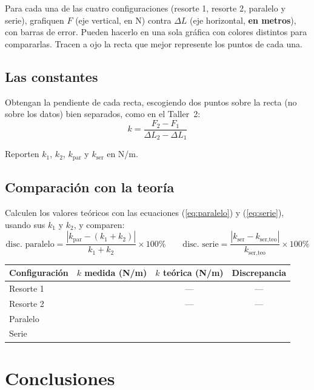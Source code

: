 \documentclass[11pt, letterpaper]{article}
\begin{document}
	Para cada una de las cuatro configuraciones (resorte 1, resorte 2, paralelo y
	serie), grafiquen $F$ (eje vertical, en N) contra $\Delta L$ (eje
	horizontal, \textbf{en metros}), con barras de error. Pueden hacerlo en una
	sola gráfica con colores distintos para compararlas. Tracen a ojo la recta
	que mejor represente los puntos de cada una.
	
	\subsection{Las constantes}
	
	Obtengan la pendiente de cada recta, escogiendo dos puntos sobre la recta
	(no sobre los datos) bien separados, como en el Taller~2:
	\[
	k = \frac{F_2 - F_1}{\Delta L_2 - \Delta L_1}
	\]
	
	\noindent
	Reporten $k_1$, $k_2$, $k_{\text{par}}$ y $k_{\text{ser}}$ en N/m.
	
	\subsection{Comparación con la teoría}
	
	Calculen los valores teóricos con las ecuaciones (\ref{eq:paralelo}) y
	(\ref{eq:serie}), usando sus $k_1$ y $k_2$, y comparen:
	\[
	\text{disc.\ paralelo} = \frac{|k_{\text{par}} - (k_1+k_2)|}{k_1+k_2}\times 100\%
	\qquad
	\text{disc.\ serie} = \frac{|k_{\text{ser}} - k_{\text{ser,teo}}|}{k_{\text{ser,teo}}}\times 100\%
	\]
	
	\begin{center}
		\small
		\begin{tabular}{|l|c|c|c|}
			\hline
			Configuración & $k$ medida (N/m) & $k$ teórica (N/m) & Discrepancia \\
			\hline
			\rule{0pt}{3ex} Resorte 1 & & --- & --- \\ \hline
			\rule{0pt}{3ex} Resorte 2 & & --- & --- \\ \hline
			\rule{0pt}{3ex} Paralelo & & & \\ \hline
			\rule{0pt}{3ex} Serie & & & \\ \hline
		\end{tabular}
	\end{center}
	
	\section{Conclusiones}
	
\end{document}
